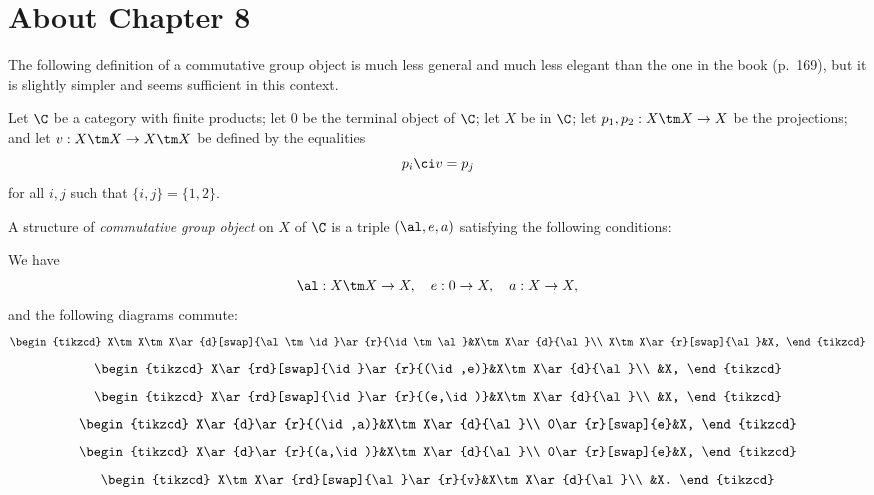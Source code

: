 \documentclass[12pt]{article}
\theoremstyle{remark}
\theoremstyle{definition}
\begin{document}
\section{About Chapter 8} 


The following definition of a commutative group object is much less general and much less elegant than the one in the book (p.~169), but it is slightly simpler and seems sufficient in this context. 

Let $\C$ be a category with finite products; let $0$ be the terminal object of $\C$; let $X$ be in $\C$; let $p_1,p_2:X\tm X\to X$ be the projections; and let $v:X\tm X\to X\tm X$ be defined by the equalities 
$$
p_i\ci v=p_j
$$ 
for all $i,j$ such that $\{i,j\}=\{1,2\}$. 

A structure of \emph{commutative group object} on $X$ of $\C$ is a triple $(\al,e,a)$ satisfying the following conditions:

We have 
$$
\al:X\tm X\to X,\quad e:0\to X,\quad a:X\to X,
$$ 
and the following diagrams commute:
$$
\begin{tikzcd}
X\tm X\tm X\ar{d}[swap]{\al\tm\id}\ar{r}{\id\tm\al}&X\tm X\ar{d}{\al}\\ 
X\tm X\ar{r}[swap]{\al}&X,
\end{tikzcd}
$$ 
$$
\begin{tikzcd}
X\ar{rd}[swap]{\id}\ar{r}{(\id,e)}&X\tm X\ar{d}{\al}\\ 
&X,
\end{tikzcd}
$$ 
$$
\begin{tikzcd}
X\ar{rd}[swap]{\id}\ar{r}{(e,\id)}&X\tm X\ar{d}{\al}\\ 
&X,
\end{tikzcd}
$$
$$
\begin{tikzcd}
X\ar{d}\ar{r}{(\id,a)}&X\tm X\ar{d}{\al}\\ 
0\ar{r}[swap]{e}&X,
\end{tikzcd}
$$
$$
\begin{tikzcd}
X\ar{d}\ar{r}{(a,\id)}&X\tm X\ar{d}{\al}\\ 
0\ar{r}[swap]{e}&X,
\end{tikzcd}
$$ 
$$
\begin{tikzcd}
X\tm X\ar{rd}[swap]{\al}\ar{r}{v}&X\tm X\ar{d}{\al}\\ 
&X.
\end{tikzcd}
$$


\end{document}
